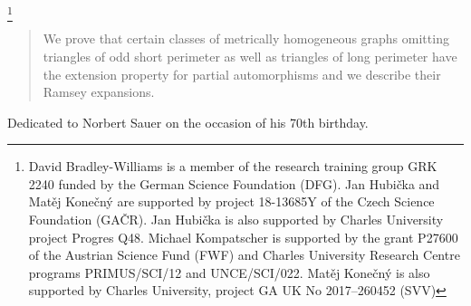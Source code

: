 \documentclass[11pt]{amsart}
\begin{document}
\thanks{David Bradley-Williams is a member of the research training group GRK 2240 funded by the German Science Foundation (DFG). Jan Hubi\v cka and Mat\v ej Kone\v cn\'y are supported by project 18-13685Y of the Czech Science Foundation (GA\v CR). Jan Hubi\v cka is also supported by Charles University project Progres Q48. Michael Kompatscher is supported by the grant P27600 of the Austrian Science Fund (FWF) and Charles University Research Centre programs PRIMUS/SCI/12 and UNCE/SCI/022. Mat\v ej Kone\v cn\'y is also supported by Charles University, project GA UK No 2017--260452 (SVV)}
\begin{abstract}
We prove that certain classes of metrically homogeneous graphs omitting triangles of odd short perimeter as well as triangles of long perimeter have the extension property for partial automorphisms and we describe their Ramsey expansions.
\end{abstract}
\maketitle
{}
\centerline{Dedicated to Norbert Sauer on the occasion of his 70th birthday.}
\end{document}
